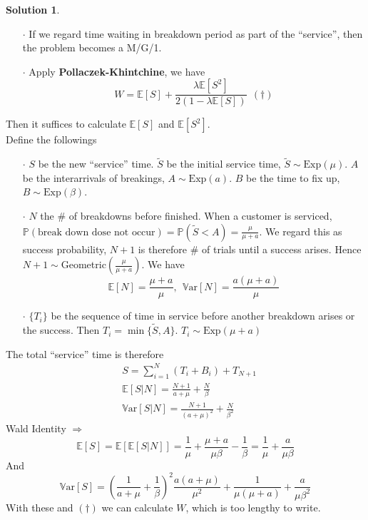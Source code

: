 \documentclass[a4paper, 10pt]{article}
\theoremstyle{definition}
\theoremstyle{hSol}
\newtheorem*{solution}{Solution}
\begin{document}
\begin{solution}
\begin{itemize}
  \item[$\cdot$] If we regard time waiting in breakdown period as part of the ``service'', then the problem becomes a M/G/1. 
  \item[$\cdot$] Apply \textbf{Pollaczek-Khintchine}, we have
  $$
  W = \mathbb{E}\left[S\right] + \frac{\lambda \mathbb{E}\left[S^2\right]}{2(1- \lambda \mathbb{E}\left[S\right])}~~(\dag)
  $$
\end{itemize}
Then it suffices to calculate $\mathbb{E}\left[S\right]$ and $\mathbb{E}\left[S^2\right]$. \\
Define the followings
\begin{itemize}
  \item[$\cdot$] $S$ be the new ``service'' time. $\tilde{S}$ be the initial service time, $\tilde{S}\sim\text{Exp}(\mu)$. $A$ be the interarrivals of breakings, $A\sim\text{Exp}(a)$. $B$ be the time to fix up, $B\sim\text{Exp}(\beta)$. 
  \item[$\cdot$] $N$ the \# of breakdowns before finished. When a customer is serviced, $\mathbb{P}\left(\text{break down dose not occur}\right)=\mathbb{P}\left(\tilde{S}<A\right)=\frac{\mu}{\mu+a}$. We regard this as success probability, $N+1$ is therefore \# of trials until a success arises. Hence $N+1\sim$Geometric$(\frac{\mu}{\mu+a})$. We have
  $$
  \mathbb{E}\left[N\right] = \frac{\mu+a}{\mu},~~\mathrm{\mathbb{V}ar}\left[N\right] = \frac{a(\mu+a)}{\mu}
  $$ 
  \item[$\cdot$] $\{T_i\}$ be the sequence of time in service before another breakdown arises or the success. Then $T_i=\min\{\tilde{S}, A\}$. $T_i\sim\text{Exp}(\mu+a)$
\end{itemize}
The total ``service'' time is therefore
\begin{equation}
  \begin{split}
    &S = \sum_{i=1}^N (T_i + B_i) + T_{N+1} \\
    & \mathbb{E}\left[S|N\right] = \frac{N+1}{a+\mu} + \frac{N}{\beta}\\
    & \mathrm{\mathbb{V}ar}\left[S|N\right] =  \frac{N+1}{(a+\mu)^2} + \frac{N}{\beta^2}
  \end{split}
\end{equation}
Wald Identity $\Rightarrow$
\begin{equation}
  \mathbb{E}\left[S\right] = \mathbb{E}\left[\mathbb{E}\left[S|N\right]\right] = \frac{1}{\mu} + \frac{\mu+a}{\mu\beta} - \frac{1}{\beta} = \frac{1}{\mu} + \frac{a}{\mu \beta}
\end{equation}
And 
\begin{equation}
  \mathrm{\mathbb{V}ar}\left[S\right] = \left(\frac{1}{a+\mu} + \frac{1}{\beta}\right)^2 \frac{a(a+\mu)}{\mu^2}+\frac{1}{\mu(\mu+a)}+\frac{a}{\mu \beta^2}
\end{equation}
With these and $(\dag)$ we can calculate $W$, which is too lengthy to write.
\end{solution}
\end{document}
